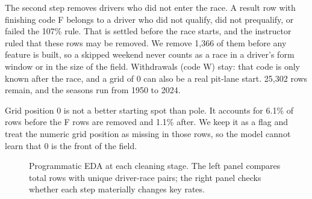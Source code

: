\documentclass[10pt,a4paper]{article}
\begin{document}
The second step removes drivers who did not enter the race. A result row with finishing code F belongs to a driver who did not qualify, did not prequalify, or failed the 107\% rule. That is settled before the race starts, and the instructor ruled that these rows may be removed. We remove 1,366 of them before any feature is built, so a skipped weekend never counts as a race in a driver's form window or in the size of the field. Withdrawals (code W) stay: that code is only known after the race, and a grid of 0 can also be a real pit-lane start. 25,302 rows remain, and the seasons run from 1950 to 2024.


Grid position 0 is not a better starting spot than pole. It accounts for 6.1\% of rows before the F rows are removed and 1.1\% after. We keep it as a flag and treat the numeric grid position as missing in those rows, so the model cannot learn that 0 is the front of the field.


\begin{figure}[H]
\centering
{}
\caption{Programmatic EDA at each cleaning stage. The left panel compares total rows with unique driver-race pairs; the right panel checks whether each step materially changes key rates.}
\end{figure}
\end{document}
